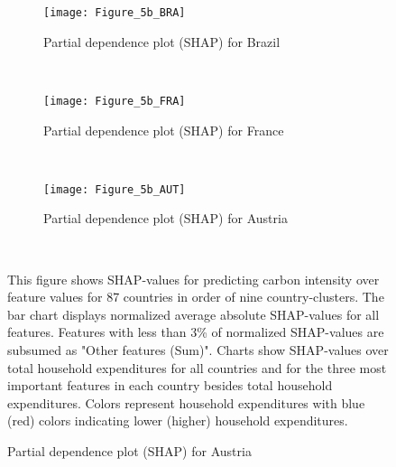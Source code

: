 \begin{figure}[ht!]\ContinuedFloat
    \centering
   \begin{subfigure}[b]{\textwidth}
         \centering
         \caption{Partial dependence plot (SHAP) for Brazil}
         \label{fig:5b_BRA}
         \texttt{[image: Figure\_5b\_BRA]}         
     \end{subfigure}
    \\
    \vspace{0.5cm}
   \begin{subfigure}[b]{\textwidth}
         \centering
         \caption{Partial dependence plot (SHAP) for France}
         \label{fig:5b_FRA}
         \texttt{[image: Figure\_5b\_FRA]}         
     \end{subfigure}
    \\
    \vspace{0.5cm}
   \begin{subfigure}[b]{\textwidth}
         \centering
         \caption{Partial dependence plot (SHAP) for Austria}
         \label{fig:5b_AUT}
         \texttt{[image: Figure\_5b\_AUT]}
    \end{subfigure}
    \\
    \vspace{0.5cm}
    \begin{subcaption2}
     This figure shows SHAP-values for predicting carbon intensity over feature values for 87 countries in order of nine country-clusters. The bar chart displays normalized average absolute SHAP-values for all features. Features with less than 3\% of normalized SHAP-values are subsumed as "Other features (Sum)". Charts show SHAP-values over total household expenditures for all countries and for the three most important features in each country besides total household expenditures. Colors represent household expenditures with blue (red) colors indicating lower (higher) household expenditures.
     \end{subcaption2}
\end{figure}


